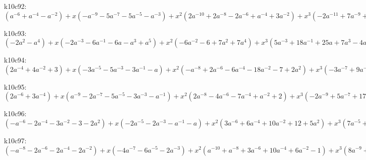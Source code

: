 k10c92: $ (a^{-6}+a^{-4}-a^{-2}) +x(-a^{-9}-5a^{-7}-5a^{-5}-a^{-3}) +x^{2}(2a^{-10}+2a^{-8}-2a^{-6}+a^{-4}+3a^{-2}) +x^{3}(-2a^{-11}+7a^{-9}+21a^{-7}+18a^{-5}+6a^{-3}) +x^{4}(a^{-12}-8a^{-10}-4a^{-8}+10a^{-6}+2a^{-4}-3a^{-2}) +x^{5}(4a^{-11}-14a^{-9}-32a^{-7}-22a^{-5}-8a^{-3}) +x^{6}(8a^{-10}-5a^{-8}-22a^{-6}-8a^{-4}+a^{-2}) +x^{7}(10a^{-9}+12a^{-7}+5a^{-5}+3a^{-3}) +x^{8}(7a^{-8}+11a^{-6}+4a^{-4}) +x^{9}(2a^{-7}+2a^{-5}) $

k10c93: $ (-2a^{2}-a^{4}) +x(-2a^{-3}-6a^{-1}-6a-a^{3}+a^{5}) +x^{2}(-6a^{-2}-6+7a^{2}+7a^{4}) +x^{3}(5a^{-3}+18a^{-1}+25a+7a^{3}-4a^{5}+a^{7}) +x^{4}(17a^{-2}+28-6a^{2}-14a^{4}+3a^{6}) +x^{5}(-4a^{-3}-10a^{-1}-29a-17a^{3}+6a^{5}) +x^{6}(-13a^{-2}-31-9a^{2}+9a^{4}) +x^{7}(a^{-3}-3a^{-1}+5a+9a^{3}) +x^{8}(3a^{-2}+9+6a^{2}) +x^{9}(2a^{-1}+2a) $

k10c94: $ (2a^{-4}+4a^{-2}+3) +x(-3a^{-5}-5a^{-3}-3a^{-1}-a) +x^{2}(-a^{-8}+2a^{-6}-6a^{-4}-18a^{-2}-7+2a^{2}) +x^{3}(-3a^{-7}+9a^{-5}+16a^{-3}+10a^{-1}+6a) +x^{4}(a^{-8}-6a^{-6}+10a^{-4}+31a^{-2}+11-3a^{2}) +x^{5}(3a^{-7}-10a^{-5}-15a^{-3}-11a^{-1}-9a) +x^{6}(5a^{-6}-9a^{-4}-27a^{-2}-12+a^{2}) +x^{7}(6a^{-5}+3a^{-3}+3a) +x^{8}(5a^{-4}+9a^{-2}+4) +x^{9}(2a^{-3}+2a^{-1}) $

k10c95: $ (2a^{-6}+3a^{-4}) +x(a^{-9}-2a^{-7}-5a^{-5}-3a^{-3}-a^{-1}) +x^{2}(2a^{-8}-4a^{-6}-7a^{-4}+a^{-2}+2) +x^{3}(-2a^{-9}+5a^{-7}+17a^{-5}+16a^{-3}+5a^{-1}-a) +x^{4}(-5a^{-8}+4a^{-6}+13a^{-4}-2a^{-2}-6) +x^{5}(a^{-9}-8a^{-7}-21a^{-5}-25a^{-3}-12a^{-1}+a) +x^{6}(3a^{-8}-6a^{-6}-19a^{-4}-6a^{-2}+4) +x^{7}(5a^{-7}+8a^{-5}+10a^{-3}+7a^{-1}) +x^{8}(5a^{-6}+11a^{-4}+6a^{-2}) +x^{9}(2a^{-5}+2a^{-3}) $

k10c96: $ (-a^{-6}-2a^{-4}-3a^{-2}-3-2a^{2}) +x(-2a^{-5}-2a^{-3}-a^{-1}-a) +x^{2}(3a^{-6}+6a^{-4}+10a^{-2}+12+5a^{2}) +x^{3}(7a^{-5}+16a^{-3}+17a^{-1}+7a-a^{3}) +x^{4}(-3a^{-6}-a^{-4}-4a^{-2}-17-10a^{2}+a^{4}) +x^{5}(-8a^{-5}-23a^{-3}-34a^{-1}-15a+4a^{3}) +x^{6}(a^{-6}-7a^{-4}-17a^{-2}+9a^{2}) +x^{7}(3a^{-5}+6a^{-3}+14a^{-1}+11a) +x^{8}(4a^{-4}+11a^{-2}+7) +x^{9}(2a^{-3}+2a^{-1}) $

k10c97: $ (-a^{-8}-2a^{-6}-2a^{-4}-2a^{-2}) +x(-4a^{-7}-6a^{-5}-2a^{-3}) +x^{2}(a^{-10}+a^{-8}+3a^{-6}+10a^{-4}+6a^{-2}-1) +x^{3}(8a^{-9}+20a^{-7}+24a^{-5}+10a^{-3}-2a^{-1}) +x^{4}(-2a^{-10}+4a^{-8}+5a^{-6}-9a^{-4}-7a^{-2}+1) +x^{5}(-11a^{-9}-28a^{-7}-32a^{-5}-12a^{-3}+3a^{-1}) +x^{6}(a^{-10}-11a^{-8}-21a^{-6}-3a^{-4}+6a^{-2}) +x^{7}(4a^{-9}+7a^{-7}+11a^{-5}+8a^{-3}) +x^{8}(5a^{-8}+11a^{-6}+6a^{-4}) +x^{9}(2a^{-7}+2a^{-5}) $

